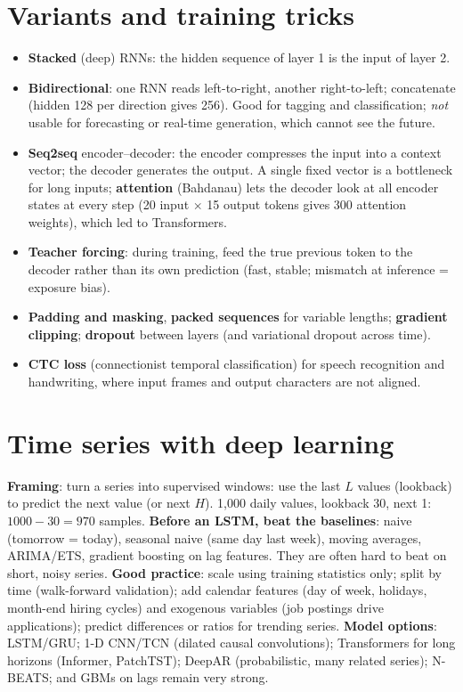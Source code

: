 \section{Variants and training tricks}
\begin{itemize}
\item \textbf{Stacked} (deep) RNNs: the hidden sequence of layer 1 is the input of layer 2.
\item \textbf{Bidirectional}: one RNN reads left-to-right, another right-to-left; concatenate (hidden 128 per direction gives 256). Good for tagging and
  classification; \emph{not} usable for forecasting or real-time generation, which cannot see the future.
\item \textbf{Seq2seq} encoder--decoder: the encoder compresses the input into a context vector; the decoder generates the output. A single fixed vector is a
  bottleneck for long inputs; \textbf{attention} (Bahdanau) lets the decoder look at all encoder states at every step (20 input $\times$ 15 output tokens gives 300 attention
  weights), which led to Transformers.
\item \textbf{Teacher forcing}: during training, feed the true previous token to the decoder rather than its own prediction (fast, stable; mismatch at inference
  = exposure bias).
\item \textbf{Padding and masking}, \textbf{packed sequences} for variable lengths; \textbf{gradient clipping}; \textbf{dropout} between layers (and variational dropout
  across time).
\item \textbf{CTC loss} (connectionist temporal classification) for speech recognition and handwriting, where input frames and output characters are not aligned.
\end{itemize}

\section{Time series with deep learning}
\textbf{Framing}: turn a series into supervised windows: use the last $L$ values (lookback) to predict the next value (or next $H$). 1{,}000 daily values, lookback 30,
next 1: $1000 - 30 = 970$ samples.
\textbf{Before an LSTM, beat the baselines}: naive (tomorrow = today), seasonal naive (same day last week), moving averages, ARIMA/ETS, gradient boosting on lag features.
They are often hard to beat on short, noisy series.
\textbf{Good practice}: scale using training statistics only; split by time (walk-forward validation); add calendar features (day of week, holidays, month-end
hiring cycles) and exogenous variables (job postings drive applications); predict differences or ratios for trending series.
\textbf{Model options}: LSTM/GRU; 1-D CNN/TCN (dilated causal convolutions); Transformers for long horizons (Informer, PatchTST); DeepAR (probabilistic, many related
series); N-BEATS; and GBMs on lags remain very strong.

